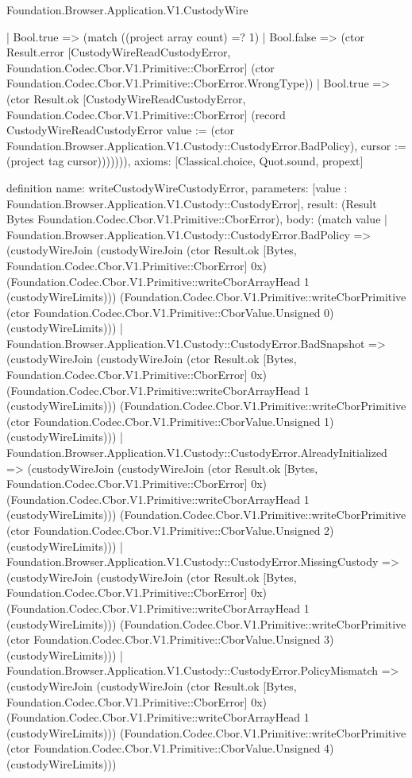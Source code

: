 \begin{lexlean}{Foundation.Browser.Application.V1.CustodyWire}
\begin{semanticmodule}
{        | Bool.true => (match ((project array count) =? 1)
          | Bool.false => (ctor Result.error [CustodyWireReadCustodyError, Foundation.Codec.Cbor.V1.Primitive::CborError] (ctor Foundation.Codec.Cbor.V1.Primitive::CborError.WrongType))
          | Bool.true => (ctor Result.ok [CustodyWireReadCustodyError, Foundation.Codec.Cbor.V1.Primitive::CborError] (record CustodyWireReadCustodyError {value := (ctor Foundation.Browser.Application.V1.Custody::CustodyError.BadPolicy), cursor := (project tag cursor)})))))),
  axioms: [Classical.choice, Quot.sound, propext]
}

definition{
  name: writeCustodyWireCustodyError,
  parameters: [value : Foundation.Browser.Application.V1.Custody::CustodyError],
  result: (Result Bytes Foundation.Codec.Cbor.V1.Primitive::CborError),
  body: (match value
    | Foundation.Browser.Application.V1.Custody::CustodyError.BadPolicy => (custodyWireJoin (custodyWireJoin (ctor Result.ok [Bytes, Foundation.Codec.Cbor.V1.Primitive::CborError] 0x) (Foundation.Codec.Cbor.V1.Primitive::writeCborArrayHead 1 (custodyWireLimits))) (Foundation.Codec.Cbor.V1.Primitive::writeCborPrimitive (ctor Foundation.Codec.Cbor.V1.Primitive::CborValue.Unsigned 0) (custodyWireLimits)))
    | Foundation.Browser.Application.V1.Custody::CustodyError.BadSnapshot => (custodyWireJoin (custodyWireJoin (ctor Result.ok [Bytes, Foundation.Codec.Cbor.V1.Primitive::CborError] 0x) (Foundation.Codec.Cbor.V1.Primitive::writeCborArrayHead 1 (custodyWireLimits))) (Foundation.Codec.Cbor.V1.Primitive::writeCborPrimitive (ctor Foundation.Codec.Cbor.V1.Primitive::CborValue.Unsigned 1) (custodyWireLimits)))
    | Foundation.Browser.Application.V1.Custody::CustodyError.AlreadyInitialized => (custodyWireJoin (custodyWireJoin (ctor Result.ok [Bytes, Foundation.Codec.Cbor.V1.Primitive::CborError] 0x) (Foundation.Codec.Cbor.V1.Primitive::writeCborArrayHead 1 (custodyWireLimits))) (Foundation.Codec.Cbor.V1.Primitive::writeCborPrimitive (ctor Foundation.Codec.Cbor.V1.Primitive::CborValue.Unsigned 2) (custodyWireLimits)))
    | Foundation.Browser.Application.V1.Custody::CustodyError.MissingCustody => (custodyWireJoin (custodyWireJoin (ctor Result.ok [Bytes, Foundation.Codec.Cbor.V1.Primitive::CborError] 0x) (Foundation.Codec.Cbor.V1.Primitive::writeCborArrayHead 1 (custodyWireLimits))) (Foundation.Codec.Cbor.V1.Primitive::writeCborPrimitive (ctor Foundation.Codec.Cbor.V1.Primitive::CborValue.Unsigned 3) (custodyWireLimits)))
    | Foundation.Browser.Application.V1.Custody::CustodyError.PolicyMismatch => (custodyWireJoin (custodyWireJoin (ctor Result.ok [Bytes, Foundation.Codec.Cbor.V1.Primitive::CborError] 0x) (Foundation.Codec.Cbor.V1.Primitive::writeCborArrayHead 1 (custodyWireLimits))) (Foundation.Codec.Cbor.V1.Primitive::writeCborPrimitive (ctor Foundation.Codec.Cbor.V1.Primitive::CborValue.Unsigned 4) (custodyWireLimits)))
}
\end{semanticmodule}
\end{lexlean}
